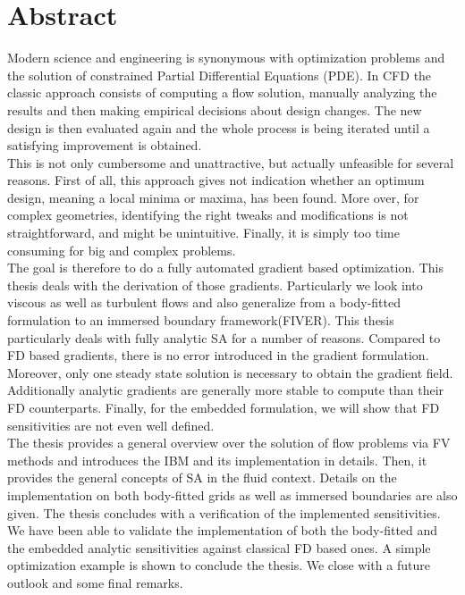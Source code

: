 \section*{Abstract}
Modern science and engineering is synonymous with optimization problems and the solution of constrained Partial Differential Equations (PDE).
In \acf{CFD} the classic approach consists of computing a flow solution, manually analyzing the results and then making empirical decisions about design changes. The new design is then evaluated again and the whole process is being iterated until a satisfying improvement is obtained.\\
This is not only cumbersome and unattractive, but actually unfeasible for several reasons. First of all, this approach gives not indication whether an optimum design, meaning a local minima or maxima, has been found. More over, for complex geometries, identifying the right tweaks and modifications is not straightforward, and might be unintuitive. Finally, it is simply too time consuming for big and complex problems.\\
The goal is therefore to do a fully automated gradient based optimization. This thesis deals with the derivation of those gradients. Particularly we look into viscous as well as turbulent flows and also generalize from a body-fitted formulation to an immersed boundary framework(FIVER). This thesis particularly deals with fully analytic \acf{SA} for a number of reasons. Compared to \acf{FD} based gradients, there is no error introduced in the gradient formulation. Moreover, only one steady state solution is necessary to obtain the gradient field. Additionally analytic gradients are generally more stable to compute than their \acf{FD} counterparts. Finally, for the embedded formulation, we will show that \ac{FD} sensitivities are not even well defined.\\
The thesis provides a general overview over the solution of flow problems via \ac{FV} methods and introduces the \acf{IBM} and its implementation in details. Then, it provides the general concepts of \ac{SA} in the fluid context. Details on the implementation on both body-fitted grids as well as immersed boundaries are also given.  The thesis concludes with a verification of the implemented sensitivities. We have been able to validate the implementation of both the body-fitted and the embedded analytic sensitivities against classical \ac{FD} based ones. A simple optimization example is shown to conclude the thesis. We close with a future outlook and some final remarks.


